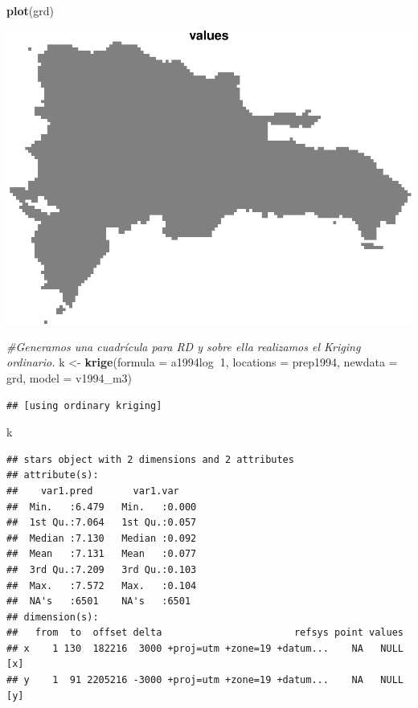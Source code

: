 \documentclass[11pt,]{article}
\newenvironment{Shaded}{\begin{snugshade}}{\end{snugshade}}
\newcommand{\KeywordTok}[1]{\textcolor[rgb]{0.13,0.29,0.53}{\textbf{#1}}}
\newcommand{\DataTypeTok}[1]{\textcolor[rgb]{0.13,0.29,0.53}{#1}}
\newcommand{\DecValTok}[1]{\textcolor[rgb]{0.00,0.00,0.81}{#1}}
\newcommand{\StringTok}[1]{\textcolor[rgb]{0.31,0.60,0.02}{#1}}
\newcommand{\CommentTok}[1]{\textcolor[rgb]{0.56,0.35,0.01}{\textit{#1}}}
\newcommand{\OperatorTok}[1]{\textcolor[rgb]{0.81,0.36,0.00}{\textbf{#1}}}
\newcommand{\NormalTok}[1]{#1}
\begin{document}
\begin{Shaded}
\begin{Highlighting}[]
\KeywordTok{plot}\NormalTok{(grd)}
\end{Highlighting}
\end{Shaded}

\includegraphics{proyecto_files/figure-latex/unnamed-chunk-4-9.pdf}

\begin{Shaded}
\begin{Highlighting}[]
\CommentTok{#Generamos una cuadrícula para RD y sobre ella realizamos el Kriging ordinario.}
\NormalTok{k <-}\StringTok{ }\KeywordTok{krige}\NormalTok{(}\DataTypeTok{formula =}\NormalTok{ a1994log}\OperatorTok{~}\DecValTok{1}\NormalTok{, }\DataTypeTok{locations =}\NormalTok{ prep1994, }\DataTypeTok{newdata =}\NormalTok{ grd, }\DataTypeTok{model =}\NormalTok{ v1994_m3)}
\end{Highlighting}
\end{Shaded}

\begin{verbatim}
## [using ordinary kriging]
\end{verbatim}

\begin{Shaded}
\begin{Highlighting}[]
\NormalTok{k}
\end{Highlighting}
\end{Shaded}

\begin{verbatim}
## stars object with 2 dimensions and 2 attributes
## attribute(s):
##    var1.pred       var1.var     
##  Min.   :6.479   Min.   :0.000  
##  1st Qu.:7.064   1st Qu.:0.057  
##  Median :7.130   Median :0.092  
##  Mean   :7.131   Mean   :0.077  
##  3rd Qu.:7.209   3rd Qu.:0.103  
##  Max.   :7.572   Max.   :0.104  
##  NA's   :6501    NA's   :6501   
## dimension(s):
##   from  to  offset delta                       refsys point values    
## x    1 130  182216  3000 +proj=utm +zone=19 +datum...    NA   NULL [x]
## y    1  91 2205216 -3000 +proj=utm +zone=19 +datum...    NA   NULL [y]
\end{verbatim}
\end{document}
